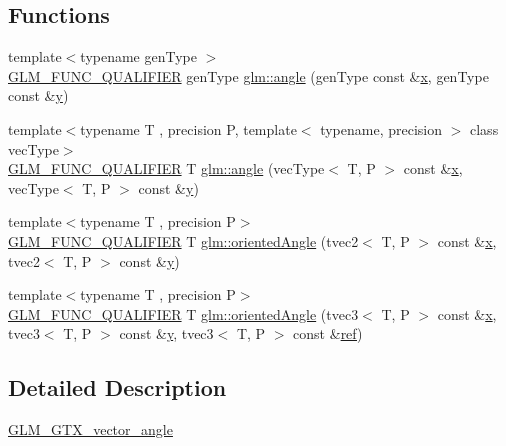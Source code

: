 \subsection*{Functions}
\begin{DoxyCompactItemize}
\item 
{\footnotesize template$<$typename gen\+Type $>$ }\\\mbox{\hyperlink{setup_8hpp_a33fdea6f91c5f834105f7415e2a64407}{G\+L\+M\+\_\+\+F\+U\+N\+C\+\_\+\+Q\+U\+A\+L\+I\+F\+I\+ER}} gen\+Type \mbox{\hyperlink{namespaceglm_a0634619b62db66fe6a4bd04da1feabea}{glm\+::angle}} (gen\+Type const \&\mbox{\hyperlink{glad_8h_a92d0386e5c19fb81ea88c9f99644ab1d}{x}}, gen\+Type const \&\mbox{\hyperlink{glad_8h_a66ddd433d2cacfe27f5906b7e86faeed}{y}})
\item 
{\footnotesize template$<$typename T , precision P, template$<$ typename, precision $>$ class vec\+Type$>$ }\\\mbox{\hyperlink{setup_8hpp_a33fdea6f91c5f834105f7415e2a64407}{G\+L\+M\+\_\+\+F\+U\+N\+C\+\_\+\+Q\+U\+A\+L\+I\+F\+I\+ER}} T \mbox{\hyperlink{namespaceglm_a8501bc310fa98bb40bec1b3c285183f1}{glm\+::angle}} (vec\+Type$<$ T, P $>$ const \&\mbox{\hyperlink{glad_8h_a92d0386e5c19fb81ea88c9f99644ab1d}{x}}, vec\+Type$<$ T, P $>$ const \&\mbox{\hyperlink{glad_8h_a66ddd433d2cacfe27f5906b7e86faeed}{y}})
\item 
{\footnotesize template$<$typename T , precision P$>$ }\\\mbox{\hyperlink{setup_8hpp_a33fdea6f91c5f834105f7415e2a64407}{G\+L\+M\+\_\+\+F\+U\+N\+C\+\_\+\+Q\+U\+A\+L\+I\+F\+I\+ER}} T \mbox{\hyperlink{group__gtx__vector__angle_ga82a19d474be13c92c7b10caab42a5a72}{glm\+::oriented\+Angle}} (tvec2$<$ T, P $>$ const \&\mbox{\hyperlink{glad_8h_a92d0386e5c19fb81ea88c9f99644ab1d}{x}}, tvec2$<$ T, P $>$ const \&\mbox{\hyperlink{glad_8h_a66ddd433d2cacfe27f5906b7e86faeed}{y}})
\item 
{\footnotesize template$<$typename T , precision P$>$ }\\\mbox{\hyperlink{setup_8hpp_a33fdea6f91c5f834105f7415e2a64407}{G\+L\+M\+\_\+\+F\+U\+N\+C\+\_\+\+Q\+U\+A\+L\+I\+F\+I\+ER}} T \mbox{\hyperlink{group__gtx__vector__angle_ga7254dba112eff55f55f9544f41cb9ece}{glm\+::oriented\+Angle}} (tvec3$<$ T, P $>$ const \&\mbox{\hyperlink{glad_8h_a92d0386e5c19fb81ea88c9f99644ab1d}{x}}, tvec3$<$ T, P $>$ const \&\mbox{\hyperlink{glad_8h_a66ddd433d2cacfe27f5906b7e86faeed}{y}}, tvec3$<$ T, P $>$ const \&\mbox{\hyperlink{glad_8h_a083de4c8e32ad3d9059245f26be721de}{ref}})
\end{DoxyCompactItemize}


\subsection{Detailed Description}
\mbox{\hyperlink{group__gtx__vector__angle}{G\+L\+M\+\_\+\+G\+T\+X\+\_\+vector\+\_\+angle}} 